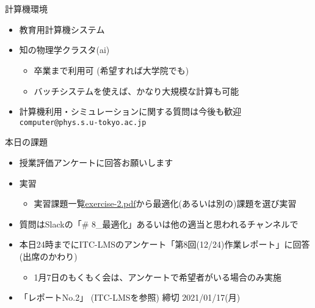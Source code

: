 \documentclass[10pt,dvipdfmx]{beamer}
\begin{document}
\section{}

\begin{frame}[t,fragile]{計算機環境}
  \begin{itemize}
  \item 教育用計算機システム
  \item 知の物理学クラスタ(ai)
    \begin{itemize}
    \item 卒業まで利用可 (希望すれば大学院でも)
    \item バッチシステムを使えば、かなり大規模な計算も可能
    \end{itemize}
  \item 計算機利用・シミュレーションに関する質問は今後も歓迎 {\tt computer@phys.s.u-tokyo.ac.jp}
  \end{itemize}
\end{frame}



\begin{frame}[t]{本日の課題}
  \begin{itemize}
  \item 授業評価アンケートに回答お願いします
  \item 実習
    \begin{itemize}
    \item 実習課題一覧\href{https://github.com/todo-group/ComputerExperiments/releases/tag/2021a-computer2}{exercise-2.pdf}から最適化(あるいは別の)課題を選び実習
    \end{itemize}
  \item 質問はSlackの「\# 8\_最適化」あるいは他の適当と思われるチャンネルで
  \item 本日24時までにITC-LMSのアンケート「第8回(12/24)作業レポート」に回答(出席のかわり)
    \begin{itemize}
    \item 1月7日のもくもく会は、アンケートで希望者がいる場合のみ実施
    \end{itemize}
  \item 「レポートNo.2」 (ITC-LMSを参照) 締切 2021/01/17(月)
  \end{itemize}
\end{frame}
\end{document}
